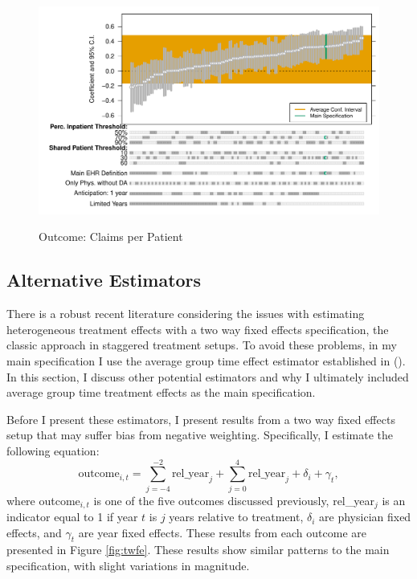 \documentclass[12pt]{article}
\begin{document}
\begin{figure}[ht]
    \centering
    \caption{Outcome: Claims per Patient}
    \includegraphics[scale=.6]{Objects/claim_chart.pdf}
    \label{fig:cpp_chart}
\end{figure}



\subsection{Alternative Estimators}\label{app:estimators}

There is a robust recent literature considering the issues with estimating heterogeneous treatment effects with a two way fixed effects specification, the classic approach in staggered treatment setups. To avoid these problems, in my main specification I use the average group time effect estimator established in \citeauthor{callaway2021difference} (\citeyear{callaway2021difference}). In this section, I discuss other potential estimators and why I ultimately included average group time treatment effects as the main specification. 

Before I present these estimators, I present results from a two way fixed effects setup that may suffer bias from negative weighting. Specifically, I estimate the following equation:
$$\text{outcome}_{i,t}=\sum_{j=-4}^{-2} \text{rel\_year}_{j} + \sum_{j=0}^{4} \text{rel\_year}_{j} + \delta_i + \gamma_t,$$
where outcome$_{i,t}$ is one of the five outcomes discussed previously, rel\_year$_j$ is an indicator equal to 1 if year $t$ is $j$ years relative to treatment, $\delta_i$ are physician fixed effects, and $\gamma_t$ are year fixed effects.
These results from each outcome are presented in Figure \ref{fig:twfe}. These results show similar patterns to the main specification, with slight variations in magnitude. 
\end{document}
